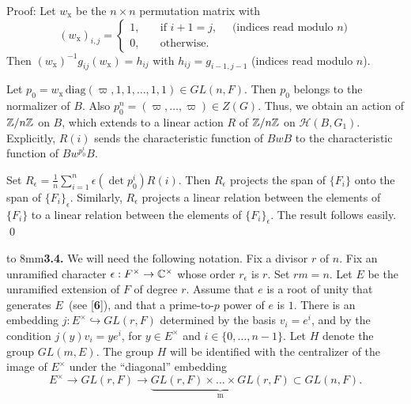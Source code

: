 \documentclass{amsart}
\begin{document}
\pproclaim Proof:
Let 
  $ w_{\text{x}} $
be the
  $ n \times n $
permutation matrix with
%
$$
  (w_{\text{x}})_{i, j} =
  \begin{cases}
    1, \quad &\text{if } i + 1 = j, \quad \text{ (indices read modulo $n$)} \\
    0, &\text{otherwise}.
  \end{cases}
$$
%
Then
  $ (w_{\text{x}})^{-1} g_{ij} (w_{\text{x}}) =
     h_{ij} $
with
  $ h_{ij} = g_{i-1, j-1} $
(indices read modulo $n$).

Let
  $ p_0 =
    w_{\text{x}} \,
    \text{diag}
    (\varpi,1, 1, \dots , 1, 1)
    \in GL(n,F) $.
    Then $p_0$ belongs to the normalizer of $B$.
Also
  $ p_0^n =
    (\varpi, \dots , \varpi) 
    \in Z (G) $.
Thus, we obtain an action of
  $ {\Bbb Z} / n {\Bbb Z} $
on $B$, which extends to a linear action $R$ of
  $ {\Bbb Z} / n {\Bbb Z} $
on
  $ {\mathcal H} (B, G_1) $.
Explicitly, $R(i)$ sends the characteristic
function of $BwB$ to the characteristic function of
  ${B w^{p_0^i} B} $.

Set
  $ R_{\epsilon} =
    \frac1n\sum_{i = 1}^n 
    \epsilon (\det p_0^i) R(i) $.
Then $R_\epsilon$ projects the span of $\{F_i\}$ onto the
span of $\{F_i\}_\epsilon$.  Similarly, $R_\epsilon$ projects
a linear relation between the elements of $\{F_i\}$ to a linear relation
between the elements of $\{F_i\}_\epsilon$.  The result
follows easily.
\qed\finishpproclaim

\bigskip
\noindent
\hbox to 8mm{{\bf 3.4.}\hfil} 
We will need the following notation.
Fix a divisor $r$ of $n$.  Fix an unramified character $\epsilon:F^\times\to{\Bbb C}^\times$
whose order $r_\epsilon$ is $r$. 
Set $ rm = n $.
Let $E$ be the unramified extension of $F$ of degree $r$.
Assume that $e$ is a root of unity that generates $E$\ (see [{\bf 6}]),
and that a prime-to-$p$ power of $e$ is $1$.  There is
an embedding
  $ j : E^{\times} \hookrightarrow GL(r,F) $
determined by the basis
  $ v_i = e^i $, 
and by the condition
  $ j(y) v_i = y e^i$, for $y \in E^{\times}$
  and $ i \in\{ 0, \dots , n-1\}$.
Let $H$ denote the group $GL(m,E)$.  The group $H$ will
be identified with the centralizer of the image of $E^\times$
under the ``diagonal'' embedding
\[
E^\times \longrightarrow GL(r,F)  \longrightarrow
     \underbrace{GL(r,F)\times\dots\times GL(r,F)}_\text{m}\subset GL(n,F).
\]
\end{document}
